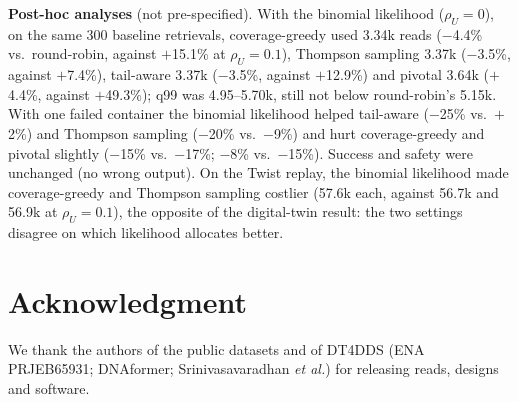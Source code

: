 \documentclass[conference,onecolumn,11pt]{IEEEtran}
\begin{document}
\textbf{Post-hoc analyses} (not pre-specified).  With the binomial likelihood ($\rho_U{=}0$), on the
same 300 baseline retrievals, coverage-greedy used 3.34k reads ($-$4.4\% vs.\ round-robin, against
$+$15.1\% at $\rho_U{=}0.1$), Thompson sampling 3.37k ($-$3.5\%, against $+$7.4\%), tail-aware 3.37k
($-$3.5\%, against $+$12.9\%) and pivotal 3.64k ($+$4.4\%, against $+$49.3\%); q99 was 4.95--5.70k, still
not below round-robin's 5.15k.  With one failed container the binomial likelihood helped tail-aware
($-$25\% vs.\ $+$2\%) and Thompson sampling ($-$20\% vs.\ $-$9\%) and hurt coverage-greedy and pivotal
slightly ($-$15\% vs.\ $-$17\%; $-$8\% vs.\ $-$15\%).  Success and safety were unchanged (no wrong
output).  On the Twist replay, the binomial likelihood made coverage-greedy and Thompson
sampling costlier (57.6k each, against 56.7k and 56.9k at $\rho_U{=}0.1$), the opposite of the
digital-twin result: the two settings disagree on which likelihood allocates better.

\section*{Acknowledgment}
We thank the authors of the public datasets and of DT4DDS (ENA PRJEB65931; DNAformer;
Srinivasavaradhan \emph{et al.}) for releasing reads, designs and software.



\end{document}
